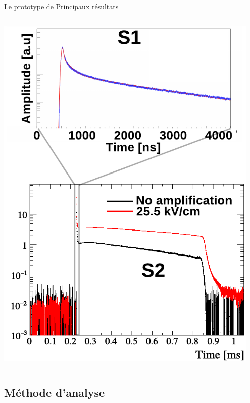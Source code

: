 \begin{frame}{Le prototype de \TOO{}}{Principaux résultats}
\begin{scriptsize}
\begin{columns}
               	\begin{column}{0.5\textwidth}
                   	\flushright\includegraphics[width=0.95\textwidth]{./pictures/scintillation.pdf}
               	\end{column}
           	\end{columns}
       	\end{scriptsize}
   	\end{frame}
   	
   	\subsection{Méthode d'analyse}
	    
